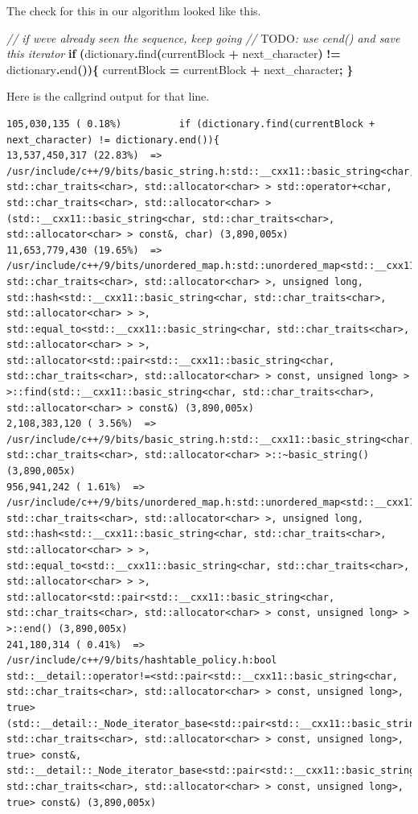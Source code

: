 \documentclass[12pt,twoside]{reedthesis}
\newenvironment{Shaded}{\begin{snugshade}}{\end{snugshade}}
\newcommand{\AlertTok}[1]{\textcolor[rgb]{0.94,0.16,0.16}{#1}}
\newcommand{\CommentTok}[1]{\textcolor[rgb]{0.56,0.35,0.01}{\textit{#1}}}
\newcommand{\ControlFlowTok}[1]{\textcolor[rgb]{0.13,0.29,0.53}{\textbf{#1}}}
\newcommand{\NormalTok}[1]{#1}
\newcommand{\OperatorTok}[1]{\textcolor[rgb]{0.81,0.36,0.00}{\textbf{#1}}}
\begin{document}
The check for this in our algorithm looked like this.
\begin{Shaded}
\begin{Highlighting}[]
        \CommentTok{// if we\textquotesingle{}ve already seen the sequence, keep going}
        \CommentTok{// }\AlertTok{TODO}\CommentTok{: use cend() and save this iterator}
        \ControlFlowTok{if} \OperatorTok{(}\NormalTok{dictionary}\OperatorTok{.}\NormalTok{find}\OperatorTok{(}\NormalTok{currentBlock }\OperatorTok{+}\NormalTok{ next\_character}\OperatorTok{)} \OperatorTok{!=}\NormalTok{ dictionary}\OperatorTok{.}\NormalTok{end}\OperatorTok{())\{}
\NormalTok{            currentBlock }\OperatorTok{=}\NormalTok{ currentBlock }\OperatorTok{+}\NormalTok{ next\_character}\OperatorTok{;}
        \OperatorTok{\}}
\end{Highlighting}
\end{Shaded}
Here is the callgrind output for that line.
\begin{verbatim}
105,030,135 ( 0.18%)          if (dictionary.find(currentBlock + next_character) != dictionary.end()){
13,537,450,317 (22.83%)  => /usr/include/c++/9/bits/basic_string.h:std::__cxx11::basic_string<char, std::char_traits<char>, std::allocator<char> > std::operator+<char, std::char_traits<char>, std::allocator<char> >(std::__cxx11::basic_string<char, std::char_traits<char>, std::allocator<char> > const&, char) (3,890,005x)
11,653,779,430 (19.65%)  => /usr/include/c++/9/bits/unordered_map.h:std::unordered_map<std::__cxx11::basic_string<char, std::char_traits<char>, std::allocator<char> >, unsigned long, std::hash<std::__cxx11::basic_string<char, std::char_traits<char>, std::allocator<char> > >, std::equal_to<std::__cxx11::basic_string<char, std::char_traits<char>, std::allocator<char> > >, std::allocator<std::pair<std::__cxx11::basic_string<char, std::char_traits<char>, std::allocator<char> > const, unsigned long> > >::find(std::__cxx11::basic_string<char, std::char_traits<char>, std::allocator<char> > const&) (3,890,005x)
2,108,383,120 ( 3.56%)  => /usr/include/c++/9/bits/basic_string.h:std::__cxx11::basic_string<char, std::char_traits<char>, std::allocator<char> >::~basic_string() (3,890,005x)
956,941,242 ( 1.61%)  => /usr/include/c++/9/bits/unordered_map.h:std::unordered_map<std::__cxx11::basic_string<char, std::char_traits<char>, std::allocator<char> >, unsigned long, std::hash<std::__cxx11::basic_string<char, std::char_traits<char>, std::allocator<char> > >, std::equal_to<std::__cxx11::basic_string<char, std::char_traits<char>, std::allocator<char> > >, std::allocator<std::pair<std::__cxx11::basic_string<char, std::char_traits<char>, std::allocator<char> > const, unsigned long> > >::end() (3,890,005x)
241,180,314 ( 0.41%)  => /usr/include/c++/9/bits/hashtable_policy.h:bool std::__detail::operator!=<std::pair<std::__cxx11::basic_string<char, std::char_traits<char>, std::allocator<char> > const, unsigned long>, true>(std::__detail::_Node_iterator_base<std::pair<std::__cxx11::basic_string<char, std::char_traits<char>, std::allocator<char> > const, unsigned long>, true> const&, std::__detail::_Node_iterator_base<std::pair<std::__cxx11::basic_string<char, std::char_traits<char>, std::allocator<char> > const, unsigned long>, true> const&) (3,890,005x)
\end{verbatim}
\end{document}
